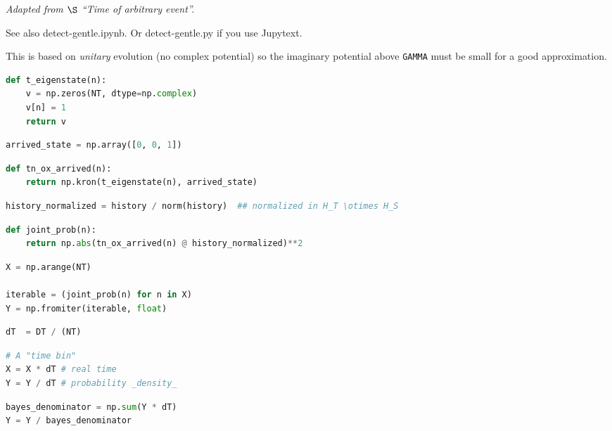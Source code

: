 \emph{Adapted from \(\S\) ``Time of arbitrary event''.}

See also
detect-gentle.ipynb.
Or detect-gentle.py
if you use Jupytext.

This is based on \emph{unitary} evolution (no complex potential) so the
imaginary potential above \texttt{GAMMA} must be
small for a good approximation.

\begin{lstlisting}[language=Python]
def t_eigenstate(n):
    v = np.zeros(NT, dtype=np.complex)
    v[n] = 1
    return v
\end{lstlisting}

\begin{lstlisting}[language=Python]
arrived_state = np.array([0, 0, 1])
\end{lstlisting}

\begin{lstlisting}[language=Python]
def tn_ox_arrived(n):
    return np.kron(t_eigenstate(n), arrived_state)
\end{lstlisting}

\begin{lstlisting}[language=Python]
history_normalized = history / norm(history)  ## normalized in H_T \otimes H_S
\end{lstlisting}

\begin{lstlisting}[language=Python]
def joint_prob(n):
    return np.abs(tn_ox_arrived(n) @ history_normalized)**2
\end{lstlisting}

\begin{lstlisting}[language=Python]
X = np.arange(NT)

iterable = (joint_prob(n) for n in X)
Y = np.fromiter(iterable, float)
\end{lstlisting}

\begin{lstlisting}[language=Python]
dT  = DT / (NT)
\end{lstlisting}

\begin{lstlisting}[language=Python]
# A "time bin"
X = X * dT # real time
Y = Y / dT # probability _density_
\end{lstlisting}

\begin{lstlisting}[language=Python]
bayes_denominator = np.sum(Y * dT)
Y = Y / bayes_denominator
\end{lstlisting}

